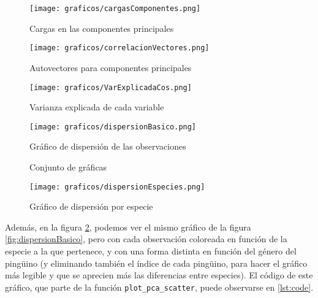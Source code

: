 \documentclass[a4paper,onecolumn]{extarticle}
\begin{document}
\begin{sloppypar}
\begin{center}
    \begin{figure}[h!]
        \centering
        \begin{minipage}{0.45\textwidth}
            \centering
            \texttt{[image: graficos/cargasComponentes.png]}
            \caption{\small{Cargas en las componentes principales}}
            \label{fig:cargas}
        \end{minipage}
        \hspace{0.005\textwidth} %
        \begin{minipage}{0.45\textwidth}
            \centering
            \texttt{[image: graficos/correlacionVectores.png]}
            \caption{\small{Autovectores para componentes principales}}
            \label{fig:vectores}
        \end{minipage}
        \centering
        \begin{minipage}{0.45\textwidth}
            \centering
            \texttt{[image: graficos/VarExplicadaCos.png]}
            \caption{\small{Varianza explicada de cada variable}}
            \label{fig:varExplicada}
        \end{minipage}
        \hspace{0.005\textwidth} %
        \begin{minipage}{0.45\textwidth}
            \centering
            \texttt{[image: graficos/dispersionBasico.png]}
            \caption{\small{Gráfico de dispersión de las observaciones}}
            \label{fig:dispersionBasico}
        \end{minipage}
        \caption{Conjunto de gráficas}
        \label{fig:multiplesGraficas}
    \end{figure}
\end{center}

\begin{center}
    \begin{figure}[h!]
        \centering
        \texttt{[image: graficos/dispersionEspecies.png]}
        \caption{Gráfico de dispersión por especie}
        \label{fig:dispersionEspecies}
    \end{figure}
\end{center}

Además, en la figura \ref{fig:dispersionEspecies}, podemos ver el mismo gráfico de la figura \ref{fig:dispersionBasico}, pero con cada observación coloreada 
en función de la especie a la que pertenece, y con una forma distinta en función del género del pingüino (y eliminando también el índice de cada pingüino, 
para hacer el gráfico más legible y que se aprecien más las diferencias entre especies). El código de este gráfico, que parte de la función 
\texttt{plot\_pca\_scatter}, puede observarse en \ref{lst:code}.


\end{sloppypar}
\end{document}
